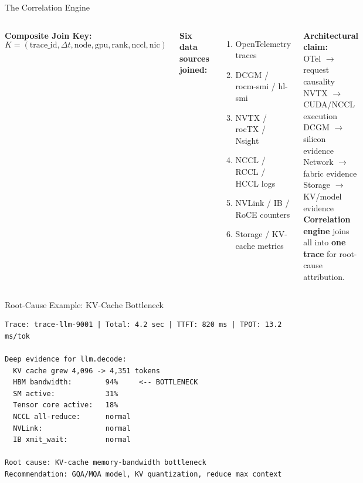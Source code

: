 \documentclass[aspectratio=169,10pt]{beamer}
\begin{document}
\begin{frame}{The Correlation Engine}
\begin{columns}[T]
\textbf{Composite Join Key:}
\begin{equation*}
K = (\text{trace\_id}, \Delta t, \text{node}, \text{gpu}, \text{rank}, \text{nccl}, \text{nic})
\end{equation*}

\textbf{Six data sources joined:}
\begin{enumerate}\small
\item OpenTelemetry traces
\item DCGM / rocm-smi / hl-smi
\item NVTX / rocTX / Nsight
\item NCCL / RCCL / HCCL logs
\item NVLink / IB / RoCE counters
\item Storage / KV-cache metrics
\end{enumerate}

\textbf{Architectural claim:}\\[0.3em]
\small
\textcolor{t1}{OTel} $\to$ request causality\\
\textcolor{nv}{NVTX} $\to$ CUDA/NCCL execution\\
\textcolor{am}{DCGM} $\to$ silicon evidence\\
\textcolor{il}{Network} $\to$ fabric evidence\\
\textcolor{gray!60}{Storage} $\to$ KV/model evidence\\[0.5em]
\textcolor{t4}{\textbf{Correlation engine}} joins all into \textbf{one trace} for root-cause attribution.
\end{columns}
\end{frame}

\begin{frame}[fragile]{Root-Cause Example: KV-Cache Bottleneck}
\begin{lstlisting}
Trace: trace-llm-9001 | Total: 4.2 sec | TTFT: 820 ms | TPOT: 13.2 ms/tok

Deep evidence for llm.decode:
  KV cache grew 4,096 -> 4,351 tokens
  HBM bandwidth:        94%     <-- BOTTLENECK
  SM active:            31%
  Tensor core active:   18%
  NCCL all-reduce:      normal
  NVLink:               normal
  IB xmit_wait:         normal

Root cause: KV-cache memory-bandwidth bottleneck
Recommendation: GQA/MQA model, KV quantization, reduce max context
\end{lstlisting}
\end{frame}
\end{document}
